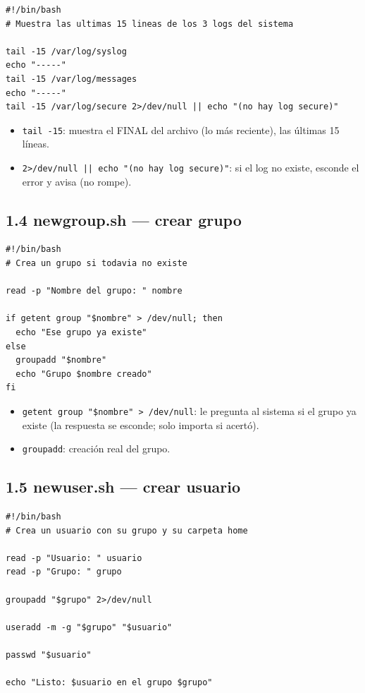 \begin{lstlisting}
#!/bin/bash
# Muestra las ultimas 15 lineas de los 3 logs del sistema

tail -15 /var/log/syslog
echo "-----"
tail -15 /var/log/messages
echo "-----"
tail -15 /var/log/secure 2>/dev/null || echo "(no hay log secure)"
\end{lstlisting}

\begin{itemize}
  \item \texttt{tail -15}: muestra el FINAL del archivo (lo más reciente), las últimas 15 líneas.
  \item \texttt{2>/dev/null || echo "(no hay log secure)"}: si el log no existe, esconde el error y avisa (no rompe).
\end{itemize}

\subsection{1.4 newgroup.sh --- crear grupo}

\begin{lstlisting}
#!/bin/bash
# Crea un grupo si todavia no existe

read -p "Nombre del grupo: " nombre

if getent group "$nombre" > /dev/null; then
  echo "Ese grupo ya existe"
else
  groupadd "$nombre"
  echo "Grupo $nombre creado"
fi
\end{lstlisting}

\begin{itemize}
  \item \texttt{getent group "\$nombre" > /dev/null}: le pregunta al sistema si el grupo ya existe (la respuesta se esconde; solo importa si acertó).
  \item \texttt{groupadd}: creación real del grupo.
\end{itemize}

\subsection{1.5 newuser.sh --- crear usuario}

\begin{lstlisting}
#!/bin/bash
# Crea un usuario con su grupo y su carpeta home

read -p "Usuario: " usuario
read -p "Grupo: " grupo

groupadd "$grupo" 2>/dev/null

useradd -m -g "$grupo" "$usuario"

passwd "$usuario"

echo "Listo: $usuario en el grupo $grupo"
\end{lstlisting}

